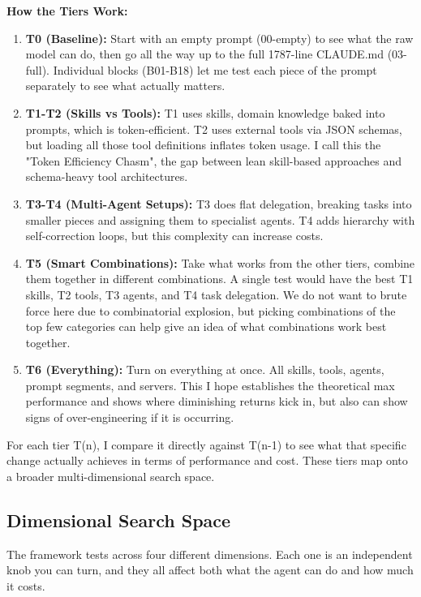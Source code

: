 \documentclass[11pt]{article}
\begin{document}
\textbf{How the Tiers Work:}

\begin{enumerate}
\item \textbf{T0 (Baseline):} Start with an empty prompt (00-empty) to see what the raw model can do, then go all the way up to the full 1787-line CLAUDE.md (03-full). Individual blocks (B01-B18) let me test each piece of the prompt separately to see what actually matters.
\item \textbf{T1-T2 (Skills vs Tools):} T1 uses skills, domain knowledge baked into prompts, which is token-efficient. T2 uses external tools via JSON schemas, but loading all those tool definitions inflates token usage. I call this the "Token Efficiency Chasm", the gap between lean skill-based approaches and schema-heavy tool architectures.
\item \textbf{T3-T4 (Multi-Agent Setups):} T3 does flat delegation, breaking tasks into smaller pieces and assigning them to specialist agents. T4 adds hierarchy with self-correction loops, but this complexity can increase costs.
\item \textbf{T5 (Smart Combinations):} Take what works from the other tiers, combine them together in different combinations. A single test would have the best T1 skills, T2 tools, T3 agents, and T4 task delegation. We do not want to brute force here due to combinatorial explosion, but picking combinations of the top few categories can help give an idea of what combinations work best together.
\item \textbf{T6 (Everything):} Turn on everything at once. All skills, tools, agents, prompt segments, and servers. This I hope establishes the theoretical max performance and shows where diminishing returns kick in, but also can show signs of over-engineering if it is occurring.
\end{enumerate}

For each tier T(n), I compare it directly against T(n-1) to see what that
specific change actually achieves in terms of performance and cost. These
tiers map onto a broader multi-dimensional search space.

\subsection{Dimensional Search Space}\label{sec:dimensions}

The framework tests across four different dimensions. Each one is an independent
knob you can turn, and they all affect both what the agent can do and how much
it costs.
\end{document}
